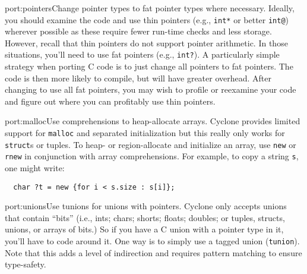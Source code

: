 \begin{porta}{port:pointers}{Change pointer types to fat pointer types where necessary.}  
Ideally, you should examine the code and use thin pointers (e.g., \texttt{int*}
or better \texttt{int@}) wherever possible as these require fewer
run-time checks and less storage.  However, recall that thin pointers
do not support pointer arithmetic.  In those situations, you'll need
to use fat pointers (e.g., \texttt{int?}).  A particularly simple strategy 
when porting C code is to just change all pointers to fat pointers.
The code is then more likely to compile, but will have greater overhead.
After changing to use all fat pointers, you may wish to profile or reexamine
your code and figure out where you can profitably use thin pointers.
\end{porta}

\begin{porta}{port:malloc}{Use comprehensions to heap-allocate arrays.}
Cyclone provides limited support for \texttt{malloc} and separated
initialization but this really only works for \texttt{struct}s or
tuples.  To heap- or region-allocate and initialize an array, use
\texttt{new} or \texttt{rnew} in conjunction with array comprehensions.  
For example, to copy a string \texttt{s}, one might write:
\begin{verbatim}
  char ?t = new {for i < s.size : s[i]};
\end{verbatim}
\end{porta}

\begin{porta}{port:unions}{Use tunions for unions with pointers.}
Cyclone only accepts unions that contain ``bits'' (i.e., ints; chars;
shorts; floats; doubles; or tuples, structs, unions, or arrays of bits.)
So if you have a C union with a pointer type in it, you'll have to
code around it.  One way is to simply use a tagged union (\texttt{tunion}).
Note that this adds a level of indirection and requires pattern
matching to ensure type-safety.  
\end{porta}

